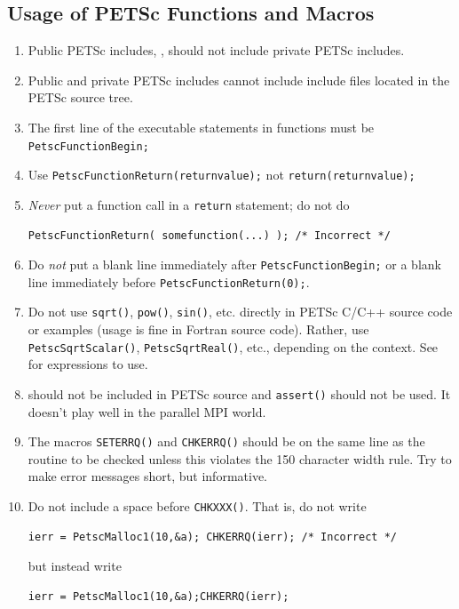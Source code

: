 \subsection{Usage of PETSc Functions and Macros}
\label{sec:stylepetsc}
\begin{enumerate}
\item Public PETSc includes, , should not include private PETSc  includes.
\item Public and private PETSc includes cannot include include files located in the PETSc source tree.
\item The first line of the executable statements in functions must be \lstinline{PetscFunctionBegin;}
\item Use \lstinline{PetscFunctionReturn(returnvalue);} not \lstinline{return(returnvalue);}
\item {\em Never} put a function call in a \lstinline{return} statement; do not do
\begin{lstlisting}
PetscFunctionReturn( somefunction(...) ); /* Incorrect */
\end{lstlisting}
\item Do {\em not} put a blank line immediately after \lstinline{PetscFunctionBegin;} or
  a blank line immediately before \lstinline{PetscFunctionReturn(0);}.
\item Do not use \lstinline{sqrt()}, \lstinline{pow()}, \lstinline{sin()}, etc. directly in PETSc C/C++ source code or examples (usage is fine in Fortran source code).
  Rather, use \lstinline{PetscSqrtScalar()}, \lstinline{PetscSqrtReal()}, etc., depending on the context.
  See  for expressions to use.
\item {} should not be included in PETSc source and \lstinline{assert()} should not be used. It doesn't play well in the parallel MPI world.
\item The macros \lstinline{SETERRQ()} and \lstinline{CHKERRQ()} should be on the
  same line as the routine to be checked unless this violates the
  150 character width rule. Try to make error messages short, but
  informative.
\item Do not include a space before \lstinline{CHKXXX()}.
  That is, do not write
\begin{lstlisting}
ierr = PetscMalloc1(10,&a); CHKERRQ(ierr); /* Incorrect */
\end{lstlisting}
but instead write
\begin{lstlisting}
ierr = PetscMalloc1(10,&a);CHKERRQ(ierr);

\end{lstlisting}
\end{enumerate}
